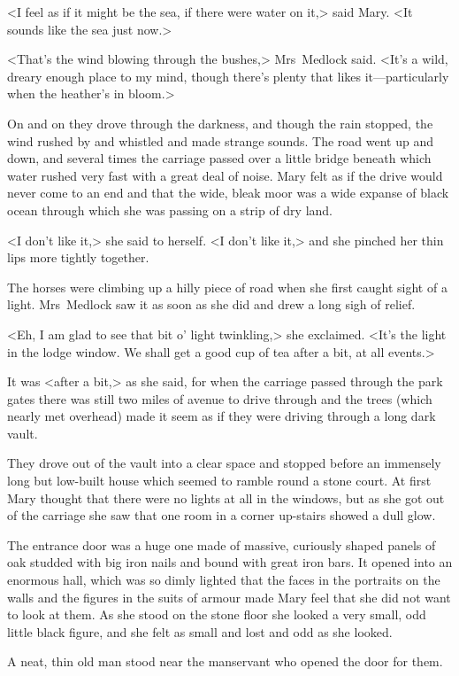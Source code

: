 <I feel as if it might be the sea, if there were water on it,> said Mary. <It sounds like the sea just now.>

<That's the wind blowing through the bushes,> Mrs~Medlock said. <It's a wild, dreary enough place to my mind, though there's plenty that likes it—particularly when the heather's in bloom.>

On and on they drove through the darkness, and though the rain stopped, the wind rushed by and whistled and made strange sounds. The road went up and down, and several times the carriage passed over a little bridge beneath which water rushed very fast with a great deal of noise. Mary felt as if the drive would never come to an end and that the wide, bleak moor was a wide expanse of black ocean through which she was passing on a strip of dry land.

<I don't like it,> she said to herself. <I don't like it,> and she pinched her thin lips more tightly together.

The horses were climbing up a hilly piece of road when she first caught sight of a light. Mrs~Medlock saw it as soon as she did and drew a long sigh of relief.

<Eh, I am glad to see that bit o' light twinkling,> she exclaimed. <It's the light in the lodge window. We shall get a good cup of tea after a bit, at all events.>

It was <after a bit,> as she said, for when the carriage passed through the park gates there was still two miles of avenue to drive through and the trees (which nearly met overhead) made it seem as if they were driving through a long dark vault.

They drove out of the vault into a clear space and stopped before an immensely long but low-built house which seemed to ramble round a stone court. At first Mary thought that there were no lights at all in the windows, but as she got out of the carriage she saw that one room in a corner up-stairs showed a dull glow.

The entrance door was a huge one made of massive, curiously shaped panels of oak studded with big iron nails and bound with great iron bars. It opened into an enormous hall, which was so dimly lighted that the faces in the portraits on the walls and the figures in the suits of armour made Mary feel that she did not want to look at them. As she stood on the stone floor she looked a very small, odd little black figure, and she felt as small and lost and odd as she looked.

A neat, thin old man stood near the manservant who opened the door for them.

